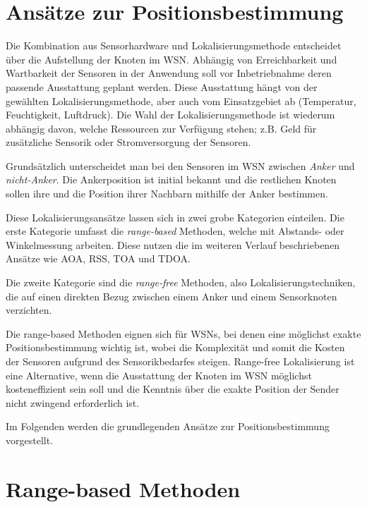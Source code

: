 \documentclass[12pt, a4wide]{scrreprt}
\begin{document}
\chapter{Ansätze zur Positionsbestimmung}
Die Kombination aus Sensorhardware und Lokalisierungsmethode entscheidet über die Aufstellung der Knoten im \acs{WSN}. Abhängig von  Erreichbarkeit und Wartbarkeit der Sensoren in der Anwendung soll vor Inbetriebnahme deren passende Ausstattung geplant werden. Diese Ausstattung hängt von der gewählten Lokalisierungsmethode, aber auch vom Einsatzgebiet ab (Temperatur, Feuchtigkeit, Luftdruck). Die Wahl der Lokalisierungsmethode ist wiederum abhängig davon, welche Ressourcen zur Verfügung stehen; z.B. Geld für zusätzliche Sensorik oder Stromversorgung der Sensoren.

Grundsätzlich unterscheidet man bei den Sensoren im WSN zwischen \textit{Anker} und \textit{nicht-Anker}. Die Ankerposition ist initial bekannt und die restlichen Knoten sollen ihre und die Position ihrer Nachbarn mithilfe der Anker bestimmen.

Diese Lokalisierungsansätze lassen sich in zwei grobe Kategorien einteilen\cite{area_based}. Die erste Kategorie umfasst die \textit{range-based} Methoden, welche mit Abstands- oder Winkelmessung arbeiten. Diese nutzen die im weiteren Verlauf beschriebenen Ansätze wie AOA, RSS, \ac{TOA} und \ac{TDOA}.

Die zweite Kategorie sind die \textit{range-free} Methoden, also Lokalisierungstechniken, die auf einen direkten Bezug zwischen einem Anker und einem Sensorknoten verzichten. 

Die range-based Methoden eignen sich für WSNs, bei denen eine möglichst exakte Positionsbestimmung wichtig ist, wobei die Komplexität und somit die Kosten der Sensoren aufgrund des Sensorikbedarfes steigen. Range-free Lokalisierung ist eine Alternative, wenn die Ausstattung der Knoten im WSN möglichst kosteneffizient sein soll und die Kenntnis über die exakte Position der Sender nicht zwingend erforderlich ist.

Im Folgenden werden die grundlegenden Ansätze zur Positionsbestimmung vorgestellt.

\chapter{Range-based Methoden}
\end{document}
